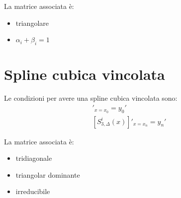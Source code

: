 La matrice associata è:
\begin{itemize}
  \item triangolare
  \item $\alpha_i + \beta_i = 1$
\end{itemize}


\section{Spline cubica vincolata}
Le condizioni per avere una spline cubica vincolata sono:
\begin{align}
  [S_{3, \Delta}^i(x)]'_{x=x_0} = y_0' \\
  [S_{3, \Delta}^i(x)]'_{x=x_n} = y_n'
\end{align}



La matrice associata è:
\begin{itemize}
  \item tridiagonale
  \item triangolar dominante
  \item irreducibile
\end{itemize}


